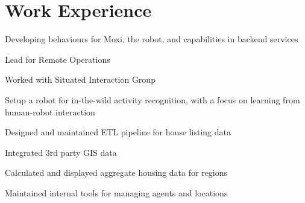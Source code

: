\documentclass[]{deedy-resume}
\begin{document}
\hfill
\begin{minipage}[t]{0.66\textwidth}


\section{Work Experience}
\vspace{0.3cm}
\begin{tightemize}
\item Developing behaviours for Moxi, the robot, and capabilities in backend services
\item Lead for Remote Operations
\end{tightemize}
\sectionsep

\vspace{0.3cm}
\begin{tightemize}
\item Worked with Situated Interaction Group
\item Setup a robot for in-the-wild activity recognition, with a focus on learning from human-robot interaction
\end{tightemize}
\sectionsep

\begin{tightemize}
\item Designed and maintained ETL pipeline for house listing data
\item Integrated 3rd party GIS data
\item Calculated and displayed aggregate housing data for regions
\item Maintained internal tools for managing agents and locations
\end{tightemize}
\sectionsep



\end{minipage}
\end{document}
